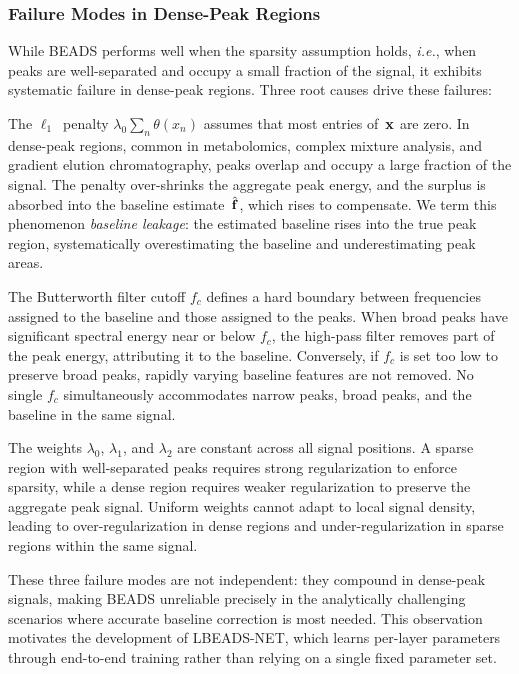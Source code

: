 \subsubsection{Failure Modes in Dense-Peak Regions}
\label{sec:bg_beads_failures}

While BEADS performs well when the sparsity assumption holds, \emph{i.e.}, when peaks are well-separated and occupy a small fraction of the signal, it exhibits systematic failure in dense-peak regions. Three root causes drive these failures:

The $\ell_1$~penalty $\lambda_0 \sum_n \theta(x_n)$ assumes that most entries of~$\mathbf{x}$ are zero.
In dense-peak regions, common in metabolomics, complex mixture analysis, and gradient elution chromatography, peaks overlap and occupy a large fraction of the signal. The penalty over-shrinks the aggregate peak energy, and the surplus is absorbed into the baseline estimate~$\hat{\mathbf{f}}$, which rises to compensate. We term this phenomenon \emph{baseline leakage}: the estimated baseline rises into the true peak region, systematically overestimating the baseline and underestimating peak areas.

The Butterworth filter cutoff $f_c$ defines a hard boundary between frequencies assigned to the baseline and those assigned to the peaks. When broad peaks have significant spectral energy near or below $f_c$, the high-pass filter removes part of the peak energy, attributing it to the baseline. Conversely, if $f_c$ is set too low to preserve broad peaks, rapidly varying baseline features are not removed. No single $f_c$ simultaneously accommodates narrow peaks, broad peaks, and the baseline in the same signal.

The weights $\lambda_0$, $\lambda_1$, and $\lambda_2$ are constant across all signal positions. A sparse region with well-separated peaks requires strong regularization to enforce sparsity, while a dense region requires weaker regularization to preserve the aggregate peak signal. Uniform weights cannot adapt to local signal density, leading to over-regularization in dense regions and under-regularization in sparse regions within the same signal.

These three failure modes are not independent: they compound in dense-peak signals, making BEADS unreliable precisely in the analytically challenging scenarios where accurate baseline correction is most needed. This observation motivates the development of LBEADS-NET, which learns per-layer parameters through end-to-end training rather than relying on a single fixed parameter set.

